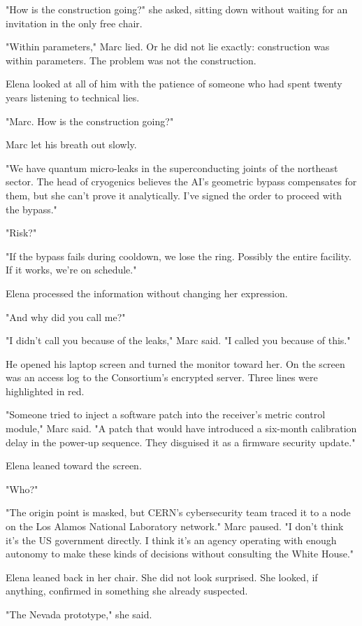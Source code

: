 \documentclass[11pt,a5paper,twoside]{book}
\begin{document}
"How is the construction going?" she asked, sitting down without waiting for an invitation in the only free chair.

"Within parameters," Marc lied. Or he did not lie exactly: construction was within parameters. The problem was not the construction.

Elena looked at all of him with the patience of someone who had spent twenty years listening to technical lies.

"Marc. How is the construction going?"

Marc let his breath out slowly.

"We have quantum micro-leaks in the superconducting joints of the northeast sector. The head of cryogenics believes the AI's geometric bypass compensates for them, but she can't prove it analytically. I've signed the order to proceed with the bypass."

"Risk?"

"If the bypass fails during cooldown, we lose the ring. Possibly the entire facility. If it works, we're on schedule."

Elena processed the information without changing her expression.

"And why did you call me?"

"I didn't call you because of the leaks," Marc said. "I called you because of this."

He opened his laptop screen and turned the monitor toward her. On the screen was an access log to the Consortium's encrypted server. Three lines were highlighted in red.

"Someone tried to inject a software patch into the receiver's metric control module," Marc said. "A patch that would have introduced a six-month calibration delay in the power-up sequence. They disguised it as a firmware security update."

Elena leaned toward the screen.

"Who?"

"The origin point is masked, but CERN's cybersecurity team traced it to a node on the Los Alamos National Laboratory network." Marc paused. "I don't think it's the US government directly. I think it's an agency operating with enough autonomy to make these kinds of decisions without consulting the White House."

Elena leaned back in her chair. She did not look surprised. She looked, if anything, confirmed in something she already suspected.

"The Nevada prototype," she said.
\end{document}
